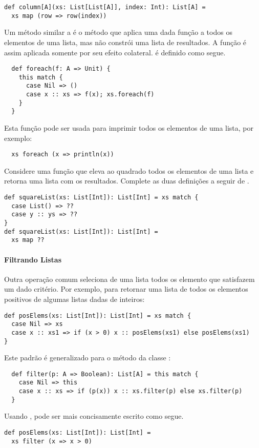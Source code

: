 \begin{lstlisting}
def column[A](xs: List[List[A]], index: Int): List[A] =
  xs map (row => row(index))
\end{lstlisting}

Um método similar a  é o método  que aplica uma dada função a todos 
os elementos de uma lista, mas não constrói uma lista de resultados. A função é assim aplicada
somente por seu efeito colateral.  é definido como segue. 
\begin{lstlisting}
  def foreach(f: A => Unit) {
    this match {
      case Nil => ()
      case x :: xs => f(x); xs.foreach(f)
    }
  }
\end{lstlisting}
Esta função pode ser usada para imprimir todos os elementos de uma lista, por exemplo:
\begin{lstlisting}
  xs foreach (x => println(x))
\end{lstlisting} 

\begin{exercise} 
Considere uma função que eleva ao quadrado todos os elementos de uma lista e retorna
uma lista com os resultados. Complete as duas definições a seguir de .

\begin{lstlisting}
def squareList(xs: List[Int]): List[Int] = xs match {
  case List() => ??
  case y :: ys => ??
}
def squareList(xs: List[Int]): List[Int] =
  xs map ??
\end{lstlisting}
\end{exercise}

\paragraph{Filtrando Listas}

Outra operação comum seleciona de uma lista todos os elemento que satisfazem um dado 
critério. Por exemplo, para retornar uma lista de todos os elementos positivos de 
algumas listas dadas de inteiros:
\begin{lstlisting}
def posElems(xs: List[Int]): List[Int] = xs match {
  case Nil => xs
  case x :: xs1 => if (x > 0) x :: posElems(xs1) else posElems(xs1)
}
\end{lstlisting}
Este padrão é generalizado para o método  da classe :
\begin{lstlisting}
  def filter(p: A => Boolean): List[A] = this match {
    case Nil => this
    case x :: xs => if (p(x)) x :: xs.filter(p) else xs.filter(p)
  }
\end{lstlisting}
Usando ,  pode ser mais concisamente escrito como segue.
\begin{lstlisting}
def posElems(xs: List[Int]): List[Int] =
  xs filter (x => x > 0)
\end{lstlisting}


